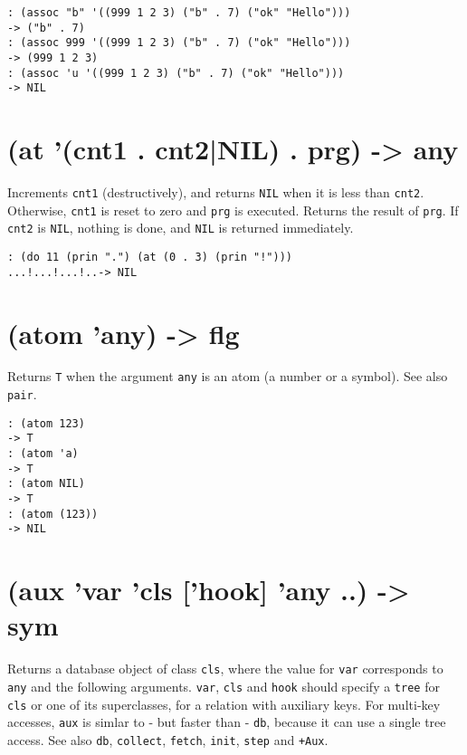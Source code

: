 {\begin{verbatim}
: (assoc "b" '((999 1 2 3) ("b" . 7) ("ok" "Hello")))
-> ("b" . 7)
: (assoc 999 '((999 1 2 3) ("b" . 7) ("ok" "Hello")))
-> (999 1 2 3)
: (assoc 'u '((999 1 2 3) ("b" . 7) ("ok" "Hello")))
-> NIL
\end{verbatim}

 
\section{(at '(cnt1 . cnt2|NIL) . prg) -> any}
\label{sec-8-1-1-33}


Increments \texttt{cnt1} (destructively), and returns \texttt{NIL} when it is less
than \texttt{cnt2}. Otherwise, \texttt{cnt1} is reset to zero and \texttt{prg} is executed.
Returns the result of \texttt{prg}. If \texttt{cnt2} is \texttt{NIL}, nothing is done, and
\texttt{NIL} is returned immediately.


\begin{verbatim}
: (do 11 (prin ".") (at (0 . 3) (prin "!")))
...!...!...!..-> NIL
\end{verbatim}

 
\section{(atom 'any) -> flg}
\label{sec-8-1-1-34}


Returns \texttt{T} when the argument \texttt{any} is an atom (a number or a symbol).
See also \texttt{pair}.


\begin{verbatim}
: (atom 123)
-> T
: (atom 'a)
-> T
: (atom NIL)
-> T
: (atom (123))
-> NIL
\end{verbatim}

 
\section{(aux 'var 'cls ['hook] 'any ..) -> sym}
\label{sec-8-1-1-35}


Returns a database object of class \texttt{cls}, where the value for \texttt{var}
corresponds to \texttt{any} and the following arguments. \texttt{var}, \texttt{cls} and
\texttt{hook} should specify a \texttt{tree} for \texttt{cls} or one of its superclasses, for
a relation with auxiliary keys. For multi-key accesses, \texttt{aux} is simlar
to - but faster than - \texttt{db}, because it can use a single tree access.
See also \texttt{db}, \texttt{collect}, \texttt{fetch}, \texttt{init}, \texttt{step} and \texttt{+Aux}.


}

